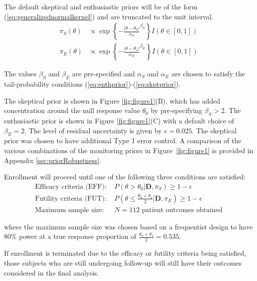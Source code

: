 \documentclass[12pt]{article}
\begin{document}
The default skeptical and enthusiastic priors will be of the form (\ref{eq:generalizednormalkernel}) and are truncated to the unit interval. 
\begin{align}
\pi_S(\theta)&\propto \exp\left\{-\frac{|\theta-\theta_0|}{\alpha_S}^{\beta_S}\right\} I(\theta\in[0,1]) \label{eq:ex1skptprior}\\
\pi_E(\theta)&\propto \exp\left\{-\frac{|\theta-\theta_1|}{\alpha_E}^{\beta_E}\right\} I(\theta\in[0,1])\label{eq:ex1enthprior}
\end{align}

The values $\beta_S$ and $\beta_E$ are pre-specified and $\alpha_S$ and $\alpha_E$ are chosen to satisfy the tail-probability conditions 
(\ref{eq:enthprior})-(\ref{eq:skptprior}).

The skeptical prior is shown in Figure \ref{fig:figure1}(B), which has added concentration around the null response value $\theta_0$ by pre-specifying $\beta_S>2$. The enthusiastic prior is shown in Figure \ref{fig:figure1}(C) with a default choice of $\beta_E=2$. The level of residual uncertainty is given by $\epsilon=0.025$. The skeptical prior was chosen to have additional Type 1 error control. A comparison of the various combinations of the monitoring priors in Figure~\ref{fig:figure1} is provided in Appendix \ref{sec:priorRobustness}.

Enrollment will proceed until one of the following three conditions are satisfied:
\begin{align}
\text{Efficacy criteria (EFF): }&P(\theta>\theta_0|\mathbf{D},\pi_S)\geq 1-\epsilon \label{eq:ex1efficacy}\\
\text{Futility criteria (FUT): }&P\left(\theta\leq\frac{\theta_0+\theta_1}{2} \Big|\mathbf{D},\pi_E\right)\geq 1-\epsilon \label{eq:ex1futility}\\
\text{Maximum sample size: }&N=112 \text{ patient outcomes obtained}\label{eq:ex1maxss}
\end{align}

where the maximum sample size was chosen based on a frequentist design to have $80\%$ power at a true response proportion of $\frac{\theta_0+\theta_1}{2}=0.535$.

If enrollment is terminated due to the efficacy or futility criteria being satisfied, those subjects who are still undergoing follow-up will still have their outcomes considered in the final analysis.
\end{document}
